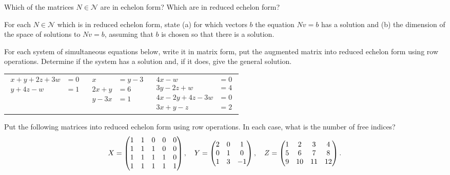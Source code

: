 \documentclass{article}
\begin{document}
\begin{Exercise}\label{exr:echform}
Which of the matrices \(N\in\mathcal{N}\) are in echelon form? Which
are in reduced echelon form?


\end{Exercise}
\begin{Exercise}\label{exr:simeqech}
For each \(N\in\mathcal{N}\) which is in reduced echelon form, state
(a) for which vectors \(b\) the equation \(Nv=b\) has a solution and
(b) the dimension of the space of solutions to \(Nv=b\), assuming
that \(b\) is chosen so that there is a solution.


\end{Exercise}
\begin{Exercise}\label{exr:simeq}
For each system of simultaneous equations below, write it in matrix
form, put the augmented matrix into reduced echelon form using row
operations. Determine if the system has a solution and, if it does,
give the general solution.


\begin{center}
\begin{tabular}{p{3cm}|p{3cm}|p{3cm}}
{\begin{align*}x+y+2z+3w&=0\\ y+4z-w&=1\end{align*}} &
{\begin{align*}x&=y-3\\ 2x+y&=6\\ y-3x&=1\end{align*}} &
{\begin{align*} 4x-w&=0\\ 3y-2z+w&=4\\ 4x-2y+4z-3w&=0\\ 3x+y-z&=2 \end{align*}}
\end{tabular}
\end{center}


\end{Exercise}
\begin{Exercise}
Put the following matrices into reduced echelon form using row
operations. In each case, what is the number of free indices?
\[X=\begin{pmatrix} 1 & 1 & 0 & 0 & 0 \\ 1 & 1 & 1 & 0 & 0 \\ 1 & 1 & 1 & 1 & 0
\\ 1 & 1 & 1 & 1 & 1 \end{pmatrix},\quad Y=\begin{pmatrix} 2 & 0 & 1 \\ 0 & 1 & 0 \\ 1 & 3
& -1\end{pmatrix},\quad Z=\begin{pmatrix} 1 & 2 & 3 & 4 \\ 5 & 6 & 7 & 8 \\ 9 & 10 & 11 &
12\end{pmatrix}.\]


\end{Exercise}
\newpage
\end{document}
